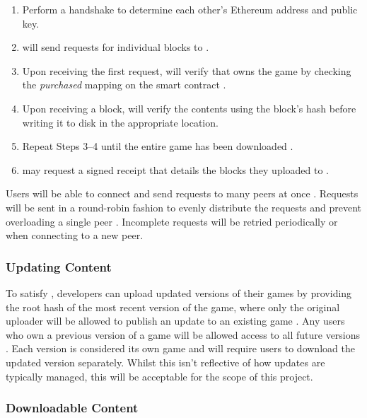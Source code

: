 \begin{enumerate}
  \item Perform a handshake to determine each other's Ethereum address and public key.
  \item \downloader will send requests for individual blocks to \seeder {}.
  \item Upon receiving the first request, \seeder will verify that \downloader owns the game by checking the \textit{purchased} mapping on the smart contract  .
  \item Upon receiving a block, \downloader will verify the contents using the block's hash  before writing it to disk in the appropriate location.
  \item Repeat Steps 3--4 until the entire game has been downloaded .
  \item \seeder may request a signed receipt that details the blocks they uploaded  to \downloader.
\end{enumerate}

\newparagraph
Users will be able to connect and send requests to many peers at once . Requests will be sent in a round-robin fashion to evenly distribute the requests and prevent overloading a single peer . Incomplete requests will be retried periodically or when connecting to a new peer.

\subsubsection*{Updating Content}\label{subsubsec:updating}

To satisfy , developers can upload updated versions of their games by providing the root hash of the most recent version of the game, where only the original uploader will be allowed to publish an update to an existing game . Any users who own a previous version of a game will be allowed access to all future versions .
\x
Each version is considered its own game and will require users to download the updated version separately. Whilst this isn't reflective of how updates are typically managed, this will be acceptable for the scope of this project.

\subsubsection*{Downloadable Content}

